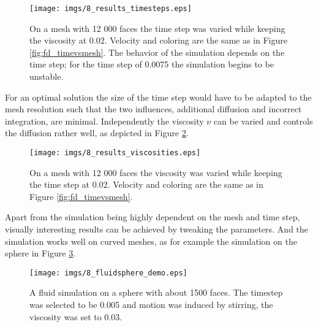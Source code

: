 \begin{figure}%
\texttt{[image: imgs/8\_results\_timesteps.eps]}%
\caption{On a mesh with 12 000 faces the time step was varied while keeping the viscosity at $0.02$. Velocity and coloring are the same as in Figure \ref{fig:fd_timevsmesh}. The behavior of the simulation depends on the time step; for the time step of 0.0075 the simulation begins to be unstable.}%
\label{fig:fd_timesteps}%
\end{figure}

For an optimal solution the size of the time step would have to be adapted to the mesh resolution such that the two influences, additional diffusion and incorrect integration, are minimal.
Independently the viscosity $\nu$ can be varied and controls the diffusion rather well, as depicted in Figure \ref{fig:fd_viscosities}.

\begin{figure}%
\texttt{[image: imgs/8\_results\_viscosities.eps]}%
\caption{On a mesh with 12 000 faces the viscosity was varied while keeping the time step at $0.02$. Velocity and coloring are the same as in Figure \ref{fig:fd_timevsmesh}.}%
\label{fig:fd_viscosities}%
\end{figure}

Apart from the simulation being highly dependent on the mesh and time step, visually interesting results can be achieved by tweaking the parameters. And the simulation works well on curved meshes, as for example the simulation on the sphere in Figure \ref{fig:fd_sphere}.

\begin{figure}%
\texttt{[image: imgs/8\_fluidsphere\_demo.eps]}%
\caption{A fluid simulation on a sphere with about 1500 faces. The timestep was selected to be 0.005 and motion was induced by stirring, the viscosity was set to 0.03. }%
\label{fig:fd_sphere}%
\end{figure}


